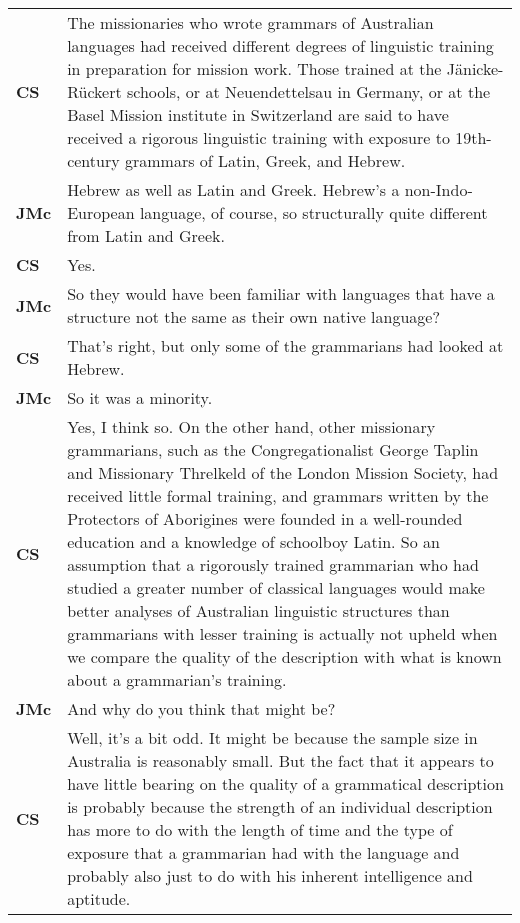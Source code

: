\documentclass[12pt]{article}
\begin{document}
\begin{flushleft}
\begin{supertabular}{m{0.24415985in}m{5.89766in}}
\textbf{CS}\newline
 &
The missionaries who wrote grammars of Australian languages had received different degrees of linguistic training in preparation for mission work. Those trained at the Jänicke-Rückert schools, or at Neuendettelsau in Germany, or at the Basel Mission institute in Switzerland are said to have received a rigorous linguistic training with exposure to 19th-century grammars of Latin, Greek, and Hebrew.\\
\textbf{JMc}\newline
 &
Hebrew as well as Latin and Greek. Hebrew’s a non-Indo-European language, of course, so structurally quite different from Latin and Greek.\\
\textbf{CS}\newline
 &
Yes.\\
\textbf{JMc}\newline
 &
So they would have been familiar with languages that have a structure not the same as their own native language?\\
\textbf{CS}\newline
 &
That’s right, but only some of the grammarians had looked at Hebrew.\\
\textbf{JMc}\newline
 &
So it was a minority.\\
\textbf{CS}\newline
 &
Yes, I think so. On the other hand, other missionary grammarians, such as the Congregationalist George Taplin and Missionary Threlkeld of the London Mission Society, had received little formal training, and grammars written by the Protectors of Aborigines were founded in a well-rounded education and a knowledge of schoolboy Latin. So an assumption that a rigorously trained grammarian who had studied a greater number of classical languages would make better analyses of Australian linguistic structures than grammarians with lesser training is actually not upheld when we compare the quality of the description with what is known about a grammarian’s training.\\
\textbf{JMc}\newline
 &
And why do you think that might be?\\
\textbf{CS}\newline
 &
Well, it’s a bit odd. It might be because the sample size in Australia is reasonably small. But the fact that it appears to have little bearing on the quality of a grammatical description is probably because the strength of an individual description has more to do with the length of time and the type of exposure that a grammarian had with the language and probably also just to do with his inherent intelligence and aptitude.\\

\end{supertabular}
\end{flushleft}
\end{document}

